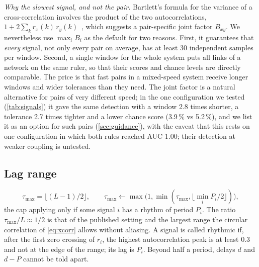 \documentclass[11pt,a4paper]{article}
\begin{document}
\emph{Why the slowest signal, and not the pair.} Bartlett's formula for the variance of a cross-correlation involves the product of the two autocorrelations, $1 + 2\sum_k r_x(k)\,r_y(k)$~\cite{Bartlett1946TheoreticalSpecification}, which suggests a pair-specific joint factor $B_{xy}$. We nevertheless use $\max_i B_i$ as the default for two reasons. First, it guarantees that \emph{every} signal, not only every pair on average, has at least 30 independent samples per window. Second, a single window for the whole system puts all links of a network on the same ruler, so that their scores and chance levels are directly comparable. The price is that fast pairs in a mixed-speed system receive longer windows and wider tolerances than they need. The joint factor is a natural alternative for pairs of very different speed; in the one configuration we tested (\cref{tab:signals}) it gave the same detection with a window 2.8 times shorter, a tolerance 2.7 times tighter and a lower chance score (3.9\,\% vs 5.2\,\%), and we list it as an option for such pairs (\cref{sec:guidance}), with the caveat that this rests on one configuration in which both rules reached AUC 1.00; their detection at weaker coupling is untested.

\subsection{Lag range}
\label{sec:lag}
\begin{equation}
\tau_{\max} = \big\lfloor (L-1)/2 \big\rfloor, \qquad \tau_{\max} \leftarrow \max\!\big(1, \min(\tau_{\max}, \lfloor \min_i P_i / 2 \rfloor)\big),
\end{equation}
the cap applying only if some signal $i$ has a rhythm of period $P_i$.
The ratio $\tau_{\max} / L \approx 1/2$ is that of the published setting and the largest range the circular correlation of \cref{eq:xcorr} allows without aliasing. A signal is called rhythmic if, after the first zero crossing of $r_i$, the highest autocorrelation peak is at least 0.3 and not at the edge of the range; its lag is $P_i$. Beyond half a period, delays $d$ and $d - P$ cannot be told apart.
\end{document}
